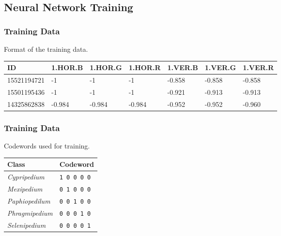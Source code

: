 \documentclass[]{beamer}
\begin{document}
    \subsection{Neural Network Training}

    \begin{frame}
        \frametitle{Training Data}

        Format of the training data.

        \begin{table}[h]\scriptsize
            \begin{center}
            \begin{tabular}{lllllll}
            \toprule
            ID & 1.HOR.B & 1.HOR.G & 1.HOR.R & 1.VER.B & 1.VER.G & 1.VER.R \\
            \midrule
            15521194721 & -1 & -1 & -1 & -0.858 & -0.858 & -0.858 \\
            15501195436 & -1 & -1 & -1 & -0.921 & -0.913 & -0.913 \\
            14325862838 & -0.984 & -0.984 & -0.984 & -0.952 & -0.952 & -0.960 \\
            \bottomrule
            \end{tabular}
            \end{center}
        \end{table}
    \end{frame}

    \begin{frame}
        \frametitle{Training Data}

        Codewords used for training.

        \begin{table}[h]\scriptsize
            \begin{center}
            \begin{tabular}{ll}
            \toprule
            \textbf{Class} & \textbf{Codeword} \\
            \midrule
            \textit{Cypripedium}    & \texttt{1 0 0 0 0} \\
            \textit{Mexipedium}     & \texttt{0 1 0 0 0} \\
            \textit{Paphiopedilum}  & \texttt{0 0 1 0 0} \\
            \textit{Phragmipedium}  & \texttt{0 0 0 1 0} \\
            \textit{Selenipedium}   & \texttt{0 0 0 0 1} \\
            \bottomrule
            \end{tabular}
            \end{center}
        \end{table}
    \end{frame}
\end{document}
